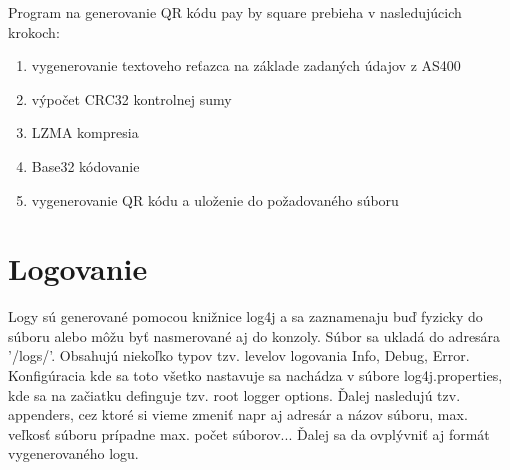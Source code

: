 Program na generovanie QR kódu pay by square prebieha v nasledujúcich krokoch:

\begin{enumerate}
    \item vygenerovanie textoveho reťazca na základe zadaných údajov z AS400
    \item výpočet CRC32 kontrolnej sumy
    \item LZMA kompresia
    \item Base32 kódovanie
    \item vygenerovanie QR kódu a uloženie do požadovaného súboru
\end{enumerate}


\section{Logovanie}
Logy sú generované pomocou knižnice log4j a sa zaznamenaju buď fyzicky do súboru alebo môžu byť nasmerované aj do konzoly. Súbor sa ukladá do adresára '/logs/'. Obsahujú niekoľko typov tzv. levelov logovania Info, Debug, Error. 
Konfigúracia kde sa toto všetko nastavuje sa nachádza v súbore log4j.properties, kde sa na začiatku definguje tzv. root logger options. Ďalej nasledujú tzv. appenders, cez ktoré si vieme zmeniť napr aj adresár a názov súboru, max. veľkosť súboru prípadne max. počet súborov... Ďalej sa da ovplývniť aj formát vygenerovaného logu.
